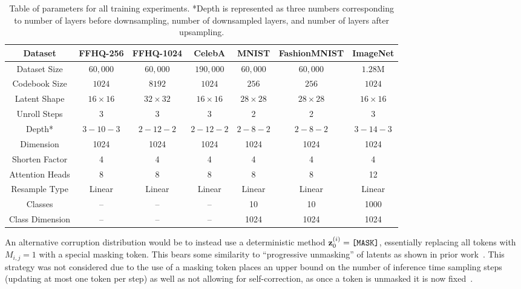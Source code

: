 \begin{table}
    \centering
    \begin{tabular}{|c||c c||c||c c||c||}
    \hline
    \textbf{Dataset} & \textbf{FFHQ-256} & \textbf{FFHQ-1024} & \textbf{CelebA}
                     & \textbf{MNIST} & \textbf{FashionMNIST} &
                     \textbf{ImageNet} \\
    \hline
    Dataset Size & $60,000$ & $60,000$ & $190,000$ & $60,000$ & $60,000$ & $1.28$M \\
    Codebook Size & $1024$ & $8192$ & $1024$ & $256$ & $256$ & $1024$ \\
    Latent Shape & $16 \times 16$ & $32 \times 32$ & $16 \times 16$ & $28 \times
                 28$ & $28 \times 28$ & $16 \times 16$ \\
    Unroll Steps & 3 & 3 & 3 & 2 & 2 & 3 \\
    \hline
    Depth* & $3-10-3$ & $2-12-2$ & $2-12-2$ & $2-8-2$ & $2-8-2$ & $3-14-3$\\
    Dimension & 1024 & 1024 & 1024 & 1024 & 1024 & 1024 \\
    Shorten Factor & 4 & 4 & 4 & 4 & 4 & 4 \\
    Attention Heads & 8 & 8 & 8 & 8 & 8 & 12 \\
    Resample Type & Linear & Linear & Linear & Linear & Linear & Linear \\
    \hline
    Classes & -- & -- & -- & 10 & 10 & 1000 \\
    Class Dimension & -- & -- & -- & 1024 & 1024 & 1024 \\
    \hline
    \end{tabular}
    \caption{Table of parameters for all training experiments. *Depth is
    represented as three numbers corresponding to number of layers before
    downsampling, number of downsampled layers, and number of layers after
    upsampling.}
\end{table}
An alternative corruption distribution would be to instead use a deterministic
method $\mathbf{z}_0^{(i)}=\texttt{[MASK]}$, essentially replacing all tokens with
$M_{i,j} = 1$ with a special masking token. This bears some similarity to
``progressive unmasking'' of latents as shown in prior
work~\cite{bondtaylor2021unleashing,austin2021structured}. This strategy was not
considered due to the use of a masking token places an upper bound on the number of
inference time sampling steps (updating at most one token per step) as well as
not allowing for self-correction, as once a token is unmasked it is now
fixed~\cite{bondtaylor2021unleashing,austin2021structured}. 

